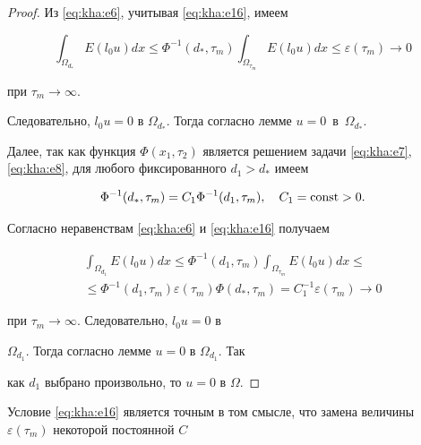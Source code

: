 \begin{proof} Из \eqref{eq:kha:e6}, учитывая \eqref{eq:kha:e16}, имеем

$$

\int _{\Omega_{d_\ast}}E(l_0u)dx \leqslant \Phi^{-1}(d_\ast,\tau_m) \int _{\Omega_{\tau_m}}E(l_0u)dx\leq \varepsilon(\tau_m)\to  0

$$

при $\tau_m\to  \infty.$ 

Следовательно, $l_0u=0$ в $\Omega_{d_\ast}.$ Тогда согласно лемме $u=0$~в~$\Omega_{d_\ast}.$



Далее, так как функция $\Phi(x_1,\tau_2)$ является решением задачи \eqref{eq:kha:e7}, \eqref{eq:kha:e8}, для любого фиксированного $d_1>d_\ast$ имеем

$$

\Phi^{-1}(d_\ast,\tau_m)=C_1\Phi^{-1}(d_1,\tau_m), \quad  C_1={\rm const}>0.

$$

\newpage



\noindent

Согласно неравенствам \eqref{eq:kha:e6} и \eqref{eq:kha:e16}  получаем

\begin{multline*}

\int _{\Omega_{d_1}}E(l_0u)dx \leqslant \Phi^{-1}(d_1,\tau_m) \int _{\Omega_{\tau_m}}E(l_0u)dx\leqslant \\ 

\leqslant

\Phi^{-1}(d_1,\tau_m)\varepsilon(\tau_m)\Phi(d_\ast,\tau_m)=

C^{-1}_1\varepsilon(\tau_m)\to  0

\end{multline*}

при $\tau_m\to  \infty.$ Следовательно, $l_0u=0$ в

$\Omega_{d_1}.$ Тогда согласно лемме $u=0$ в $\Omega_{d_1}.$ Так

как  $d_1$ выбрано произвольно, то $u=0$ в $\Omega.$

\end{proof}



\smallskip



Условие \eqref{eq:kha:e16} является точным в том смысле, что замена величины $\varepsilon(\tau_m)$ некоторой постоянной $C$

